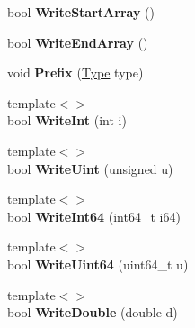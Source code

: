 \begin{DoxyCompactItemize}
\item 
bool {\bfseries Write\+Start\+Array} ()\hypertarget{class_writer_af3804bde535cf36e0733c07a56742111}{}\label{class_writer_af3804bde535cf36e0733c07a56742111}

\item 
bool {\bfseries Write\+End\+Array} ()\hypertarget{class_writer_a9d7ec17cfb0b64a88c009871ba741f52}{}\label{class_writer_a9d7ec17cfb0b64a88c009871ba741f52}

\item 
void {\bfseries Prefix} (\hyperlink{rapidjson_8h_a1d1cfd8ffb84e947f82999c682b666a7}{Type} type)\hypertarget{class_writer_ad56f2e953b7919ad2157a2fc2bedf873}{}\label{class_writer_ad56f2e953b7919ad2157a2fc2bedf873}

\item 
{\footnotesize template$<$$>$ }\\bool {\bfseries Write\+Int} (int i)\hypertarget{class_writer_abefb163a93b376d056edecad5a7a82ef}{}\label{class_writer_abefb163a93b376d056edecad5a7a82ef}

\item 
{\footnotesize template$<$$>$ }\\bool {\bfseries Write\+Uint} (unsigned u)\hypertarget{class_writer_a9665a4a1549b286944b21927b80060cf}{}\label{class_writer_a9665a4a1549b286944b21927b80060cf}

\item 
{\footnotesize template$<$$>$ }\\bool {\bfseries Write\+Int64} (int64\+\_\+t i64)\hypertarget{class_writer_a3528a42394d50f3b92659de517433c85}{}\label{class_writer_a3528a42394d50f3b92659de517433c85}

\item 
{\footnotesize template$<$$>$ }\\bool {\bfseries Write\+Uint64} (uint64\+\_\+t u)\hypertarget{class_writer_a025b3d2ca07d539a7067575e95f5578d}{}\label{class_writer_a025b3d2ca07d539a7067575e95f5578d}

\item 
{\footnotesize template$<$$>$ }\\bool {\bfseries Write\+Double} (double d)\hypertarget{class_writer_af317e1d24249b8c68503a6253c703bd2}{}\label{class_writer_af317e1d24249b8c68503a6253c703bd2}

\end{DoxyCompactItemize}
